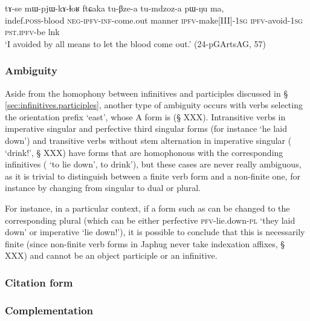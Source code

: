 \begin{exe}
\ex \label{mWpjWkAlhoR.ftCaka}
 \gll  tɤ-se mɯ-pjɯ-kɤ-ɬoʁ ftɕaka tu-βze-a tu-mdzoz-a pɯ-ŋu ma, \\
 indef.\textsc{poss}-blood \textsc{neg}-\textsc{ipfv}-\textsc{inf}-come.out manner \textsc{ipfv}-make[III]-\textsc{1sg} \textsc{ipfv}-avoid-\textsc{1sg} \textsc{pst}.\textsc{ipfv}-be lnk \\
\glt `I avoided by all means to let the blood come out.' (24-pGArtsAG, 57)
 \end{exe}
 
\subsubsection{Ambiguity}  \label{sec:velar.inf.ambiguity}
Aside from the homophony between infinitives and participles discussed in § \ref{sec:infinitives.participles}, another type of ambiguity occurs with verbs selecting the orientation prefix `east', whose A form is  (§ XXX). Intransitive verbs in imperative singular and perfective third singular forms (for instance  `he laid down') and transitive verbs without stem alternation in imperative singular ( `drink!', § XXX) have forms that are homophonous with the corresponding infinitives (  `to lie down',   to drink'), but these cases are never really ambiguous, as it is trivial to distinguish between a finite verb form and a non-finite one, for instance by changing from singular to dual or plural. 

For instance, in a particular context, if a form such as  can be changed to the corresponding plural  (which can be either perfective \textsc{pfv}-lie.down-\textsc{pl} `they laid down' or imperative `lie down!'), it is possible to conclude that this  is necessarily finite (since non-finite verb forms in Japhug never take indexation affixes, § XXX) and cannot be an object participle or an infinitive.

\subsubsection{Citation form} \label{sec:inf.citation}

\subsubsection{Complementation}    \label{sec:inf.complementation}

